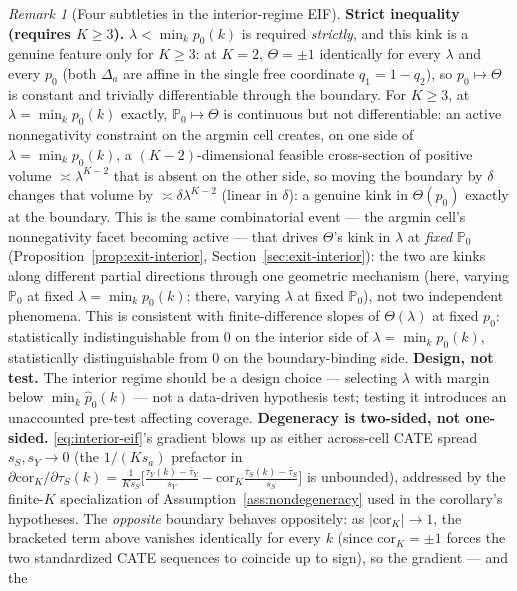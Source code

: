 \documentclass[11pt]{article}
\theoremstyle{plain}
\theoremstyle{definition}
\theoremstyle{remark}
\newtheorem{remark}[theorem]{Remark}
\newcommand{\PP}{\mathbb{P}}
\newcommand{\Corr}{\mathrm{cor}}
\begin{document}
\begin{remark}[Four subtleties in the interior-regime EIF]\label{rem:interior-eif-scope}
\textbf{Strict inequality (requires $K\ge3$).} $\lambda<\min_kp_0(k)$ is required
\emph{strictly}, and this kink is a genuine feature only for $K\ge3$: at $K=2$,
$\Theta=\pm1$ identically for every $\lambda$ and every $p_0$ (both $\Delta_a$ are
affine in the single free coordinate $q_1=1-q_2$), so $p_0\mapsto\Theta$ is constant
and trivially differentiable through the boundary. For $K\ge3$, at
$\lambda=\min_kp_0(k)$ exactly, $\PP_0\mapsto\Theta$ is continuous but not
differentiable: an active nonnegativity constraint on the argmin cell creates, on
one side of $\lambda=\min_kp_0(k)$, a $(K-2)$-dimensional feasible cross-section of
positive volume $\asymp\lambda^{K-2}$ that is absent on the other side, so moving
the boundary by $\delta$ changes that volume by $\asymp\delta\lambda^{K-2}$ (linear
in $\delta$): a genuine kink in $\Theta(p_0)$ exactly at the boundary. This is the
same combinatorial event --- the argmin cell's nonnegativity facet becoming active
--- that drives $\Theta$'s kink in $\lambda$ at \emph{fixed} $\PP_0$
(Proposition~\ref{prop:exit-interior}, Section~\ref{sec:exit-interior}): the two are
kinks along different partial directions through one geometric mechanism (here,
varying $\PP_0$ at fixed $\lambda=\min_kp_0(k)$; there, varying $\lambda$ at fixed
$\PP_0$), not two independent phenomena. This is
consistent with finite-difference slopes of $\Theta(\lambda)$ at fixed $p_0$:
statistically indistinguishable from $0$ on the interior side of
$\lambda=\min_kp_0(k)$, statistically distinguishable from $0$ on the
boundary-binding side. \textbf{Design, not test.} The interior regime should
be a design choice --- selecting $\lambda$ with margin below $\min_k\hat p_0(k)$ ---
not a data-driven hypothesis test; testing it introduces an unaccounted pre-test
affecting coverage. \textbf{Degeneracy is two-sided, not one-sided.}
\eqref{eq:interior-eif}'s gradient blows up as either across-cell CATE spread
$s_S,s_Y\to0$ (the $1/(Ks_a)$ prefactor in
$\partial\Corr_K/\partial\tau_S(k)=\frac1{Ks_S}\big[\frac{\tau_Y(k)-\bar\tau_Y}{s_Y}-\Corr_K\frac{\tau_S(k)-\bar\tau_S}{s_S}\big]$
is unbounded), addressed by the finite-$K$ specialization of
Assumption~\ref{ass:nondegeneracy} used in the corollary's hypotheses. The
\emph{opposite} boundary behaves oppositely: as $|\Corr_K|\to1$, the bracketed term
above vanishes identically for every $k$ (since $\Corr_K=\pm1$ forces the two
standardized CATE sequences to coincide up to sign), so the gradient --- and the

\end{remark}
\end{document}
